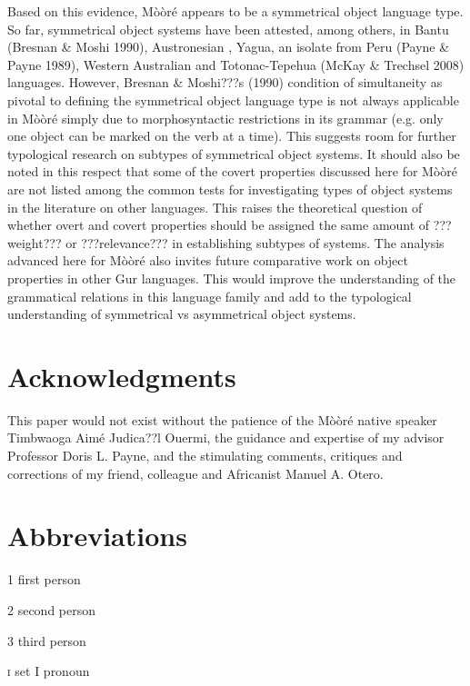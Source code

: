 \documentclass[output=paper]{langsci/langscibook}
\begin{document}
Based on this evidence, Mòòré appears to be a symmetrical object language type. So far, symmetrical object systems have been attested, among others, in Bantu (Bresnan \& Moshi 1990), Austronesian \citep{Donohue1996}, Yagua, an isolate from Peru (Payne \& Payne 1989), Western Australian \citep{Dench1995} and Totonac-Tepehua (McKay \& Trechsel 2008) languages. However, Bresnan \& Moshi???s (1990)  condition of simultaneity as pivotal to defining the symmetrical object language type is not always applicable in Mòòré simply due to morphosyntactic restrictions in its grammar (e.g. only one object can be marked on the verb at a time). This suggests room for further typological research on subtypes of symmetrical object systems. It should also be noted in this respect that some of the covert properties discussed here for Mòòré are not listed among the common tests for investigating types of object systems in the literature on other languages. This raises the theoretical question of whether overt and covert properties should be assigned the same amount of ???weight??? or ???relevance??? in establishing subtypes of systems. The analysis advanced here for Mòòré also invites future comparative work on object properties in other Gur languages. This would improve the understanding of the grammatical relations in this language family and add to the typological understanding of symmetrical vs asymmetrical object systems.

\section*{Acknowledgments}

This paper would not exist without the patience of the Mòòré native speaker Timbwaoga Aimé Judica??l Ouermi, the guidance and expertise of my advisor Professor Doris L. Payne, and the stimulating comments, critiques and corrections of my friend, colleague and Africanist Manuel A. Otero. 

\section{Abbreviations}

1  first person



2  second person



3  third person



\textsc{i  }set I pronoun
\end{document}
